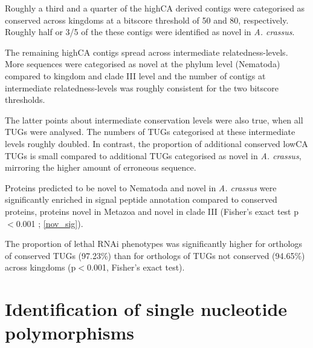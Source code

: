 \afterpage{\clearpage}

Roughly a third and a quarter of the highCA derived contigs were
categorised as conserved across kingdoms at a bitscore threshold of 50
and 80, respectively. Roughly half or 3/5 of the these contigs were
identified as novel in \textit{A. crassus}.

The remaining highCA contigs spread across intermediate
relatedness-levels. More sequences were categorised as novel at the
phylum level (Nematoda) compared to kingdom and clade III level and
the number of contigs at intermediate relatedness-levels was roughly
consistent for the two bitscore thresholds.

The latter points about intermediate conservation levels were also
true, when all TUGs were analysed. The numbers of TUGs categorised at
these intermediate levels roughly doubled. In contrast, the proportion
of additional conserved lowCA TUGs is small compared to additional
TUGs categorised as novel in \textit{A. crassus}, mirroring the higher
amount of erroneous sequence.

Proteins predicted to be novel to Nematoda and novel in
\textit{A. crassus} were significantly enriched in signal peptide
annotation compared to conserved proteins, proteins novel in Metazoa
and novel in clade III (Fisher's exact test p$<$0.001 ;
\ref{nov_sig}).


The proportion of lethal RNAi phenotypes was significantly higher for
orthologs of conserved TUGs (97.23\%) than for orthologs of TUGs not
conserved (94.65\%) across kingdoms (p$<$0.001, Fisher's exact test).

\section{Identification of single nucleotide polymorphisms}

